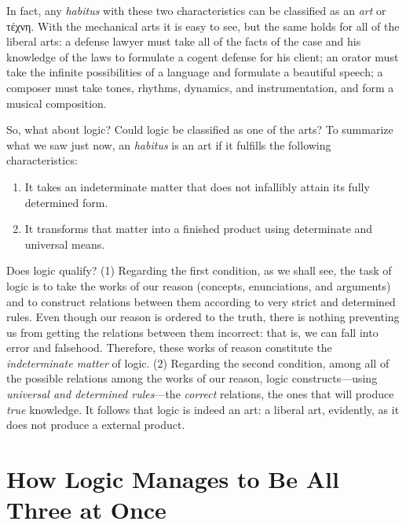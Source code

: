 \documentclass[
  12pt,
]{memoir}
\begin{document}
In fact, any \emph{habitus} with these two characteristics can be
classified as an \emph{art} or τέχνη. With the mechanical arts it is
easy to see, but the same holds for all of the liberal arts: a defense
lawyer must take all of the facts of the case and his knowledge of the
laws to formulate a cogent defense for his client; an orator must take
the infinite possibilities of a language and formulate a beautiful
speech; a composer must take tones, rhythms, dynamics, and
instrumentation, and form a musical composition.

So, what about logic? Could logic be classified as one of the arts? To
summarize what we saw just now, an \emph{habitus} is an art if it
fulfills the following characteristics:

\begin{enumerate}
\def\labelenumi{\arabic{enumi}.}
\item
  It takes an indeterminate matter that does not infallibly attain its
  fully determined form.
\item
  It transforms that matter into a finished product using determinate
  and universal means.
\end{enumerate}

\noindent Does logic qualify? (1) Regarding the first condition, as we
shall see, the task of logic is to take the works of our reason
(concepts, enunciations, and arguments) and to construct relations
between them according to very strict and determined rules. Even though
our reason is ordered to the truth, there is nothing preventing us from
getting the relations between them incorrect: that is, we can fall into
error and falsehood. Therefore, these works of reason constitute the
\emph{indeterminate matter} of logic. (2) Regarding the second
condition, among all of the possible relations among the works of our
reason, logic constructs---using \emph{universal and determined
rules}---the \emph{correct} relations, the ones that will produce
\emph{true} knowledge. It follows that logic is indeed an art: a liberal
art, evidently, as it does not produce a external product.

\section{How Logic Manages to Be All Three at
Once}\label{how-logic-manages-to-be-all-three-at-once}
\end{document}
